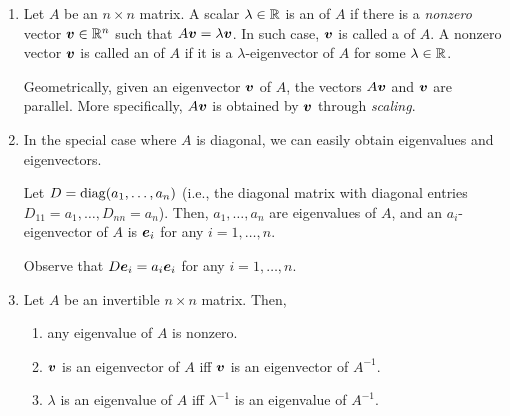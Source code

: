 \begin{enumerate}
\item Let \(A\) be an \(n\times n\) matrix. A scalar \(\lambda\in\mathbb{R}\) is an
 of \(A\) if there is a \emph{nonzero} vector
\(\vb*{v}\in\mathbb{R}^n\) such that \(A\vb*{v}=\lambda\vb*{v}\). In such case,
\(\vb*{v}\) is called a  of \(A\). A nonzero
vector \(\vb*{v}\) is called an  of \(A\) if it is a
\(\lambda\)-eigenvector of \(A\) for some \(\lambda\in\mathbb{R}\).


Geometrically, given an eigenvector \(\vb*{v}\) of \(A\), the vectors
\(A\vb*{v}\) and \(\vb*{v}\) are parallel. More specifically, \(A\vb*{v}\)
is obtained by \(\vb*{v}\) through \emph{scaling}.

\item In the special case where \(A\) is diagonal, we can easily obtain
eigenvalues and eigenvectors.

\begin{proposition}
\label{prp:eigen-diagonal}
Let \(D=\operatorname{diag}(a_1,\dotsc,a_n)\) (i.e., the diagonal matrix with diagonal
entries \(D_{11}=a_1,\dotsc,D_{nn}=a_n\)). Then, \(a_1,\dotsc,a_n\) are
eigenvalues of \(A\), and an \(a_i\)-eigenvector of \(A\) is \(\vb*{e}_i\) for
any \(i=1,\dotsc,n\).
\end{proposition}
\begin{pf}
Observe that \(D\vb*{e}_i=a_i\vb*{e}_i\) for any \(i=1,\dotsc,n\).
\end{pf}

\item \label{it:inv-eigen} Let \(A\) be an invertible \(n\times n\) matrix.
Then,
\begin{enumerate}
\item any eigenvalue of \(A\) is nonzero.
\item \(\vb*{v}\) is an eigenvector of \(A\) iff \(\vb*{v}\) is an
eigenvector of \(A^{-1}\).
\item \(\lambda\) is an eigenvalue of \(A\) iff \(\lambda^{-1}\) is an
eigenvalue of \(A^{-1}\).
\end{enumerate}


\end{enumerate}
